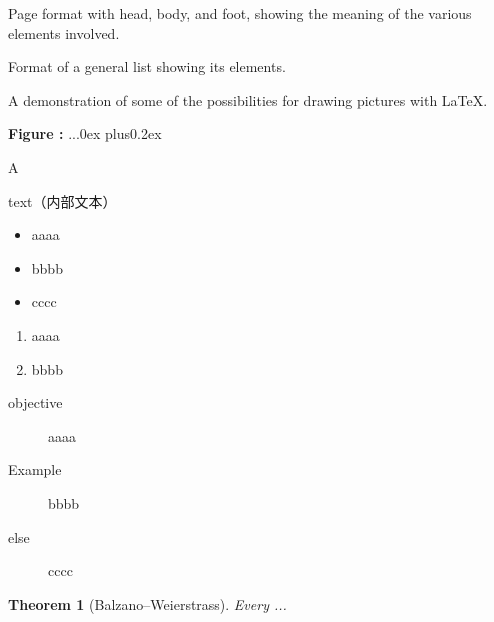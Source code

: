 \documentclass[12pt,twoside,a4paper]{article}   %
\begin{document}
	\begin{list}{\bfseries\upshape Figure :}
		{
		\setlength{\labelwidth}{2cm}\setlength{\leftmargin}{2.6cm}
		\setlength{\labelsep}{0.5cm}\setlength{\rightmargin}{1cm}
		\setlength{\parsep}{0.5ex plus0.2ex minus0.1ex}
		\setlength{\itemsep}{0ex plus0.2ex} \slshape}
		\item Page format with head, body, and foot, showing the meaning of the various elements involved.
		\item Format of a general list showing its elements.
		\item A demonstration of some of the possibilities for drawing pictures with \LaTeX.
	\end{list}

	\newenvironment{figlist}{\begin{list}
		{\bfseries\upshape Figure \arabic{fig}:}
		{...{0ex plus0.2ex}\slshape}}
		{\end{list}}
	\begin{figlist}
		\item A
	\end{figlist}
	\begin{trivlist}
		\centering \item[] text（内部文本）
	\end{trivlist}
	\begin{itemize}
	\item aaaa
	\item bbbb
	\item cccc
	\end{itemize}
	\begin{enumerate}
	\item aaaa
	\item bbbb
	\end{enumerate}
	\begin{description}
	\item[objective] aaaa
	\item[Example] bbbb
	\item[else] cccc
	\end{description}
	\newtheorem{theorem}{Theorem}
	\newtheorem{axiom}{Axiom}
	\begin{theorem}[Balzano--Weierstrass]
		Every ...
	\end{theorem}
\end{document}
